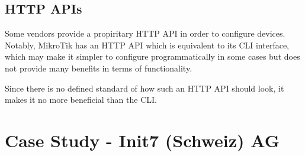 \subsection{HTTP APIs}

Some vendors provide a propiritary HTTP API in order to configure devices.
Notably, MikroTik has an HTTP API which is equivalent to its CLI interface,
which may make it simpler to configure programmatically in some cases but
does not provide many benefits in terms of functionality.

Since there is no defined standard of how such an HTTP API should look,
it makes it no more beneficial than the CLI. 

\section{Case Study - Init7 (Schweiz) AG}




